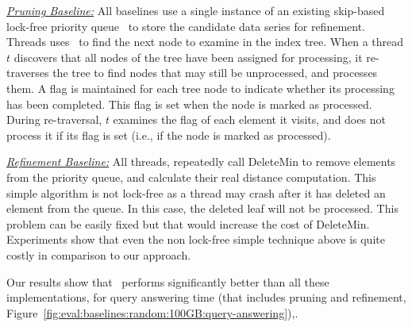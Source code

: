 \noindent
{\emph{\underline{Pruning Baseline:}}}
All baselines use a single instance of an existing skip-based lock-free priority queue~\cite{LJ13}
to store the candidate data series for refinement.
Threads uses \FAI\ to find the next node to examine in the index tree.
When a thread $t$ discovers that all nodes 
of the tree have been assigned for processing, it re-traverses 
the tree to find nodes that may still  be
unprocessed, and processes them. 
A flag is maintained for each tree node to indicate whether its
processing has been completed. This flag is set when the node is marked as processed. 
During re-traversal, $t$ examines
the flag of each element it visits, and does not process it if 
its flag is set (i.e., if the node is marked as processed).

\noindent
{\emph{\underline{Refinement Baseline:}}}
All threads, repeatedly call DeleteMin
to remove elements from the priority queue, and calculate their real distance computation. 
This simple algorithm is not lock-free as a thread may crash after it has
deleted an element from the queue. In this case, the deleted leaf will not be 
processed. This problem can be easily fixed but that would increase the cost 
of DeleteMin. Experiments show that even the non lock-free simple technique
above is quite costly in comparison to our approach.

Our results show that \Fresh\
performs significantly better than all these implementations,
for query answering time (that includes pruning and refinement, 
Figure~\ref{fig:eval:baselines:random:100GB:query-answering}),.

